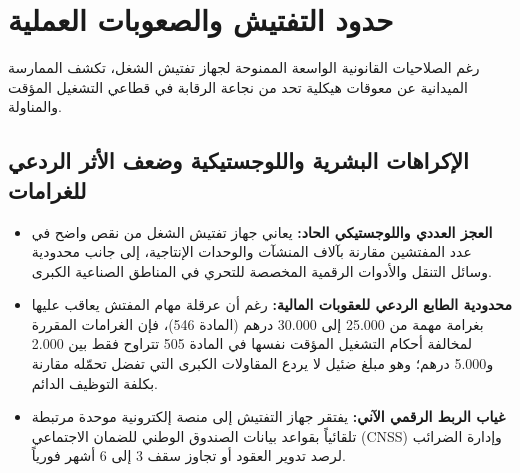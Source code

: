 \vspace{0.5em}

\section{حدود التفتيش والصعوبات العملية}

رغم الصلاحيات القانونية الواسعة الممنوحة لجهاز تفتيش الشغل، تكشف الممارسة الميدانية عن معوقات هيكلية تحد من نجاعة الرقابة في قطاعي التشغيل المؤقت والمناولة.

\subsection{الإكراهات البشرية واللوجستيكية وضعف الأثر الردعي للغرامات}
\begin{itemize}[leftmargin=*, itemsep=5pt]
    \item \textbf{العجز العددي واللوجستيكي الحاد:} يعاني جهاز تفتيش الشغل من نقص واضح في عدد المفتشين مقارنة بآلاف المنشآت والوحدات الإنتاجية، إلى جانب محدودية وسائل التنقل والأدوات الرقمية المخصصة للتحري في المناطق الصناعية الكبرى.
    \item \textbf{محدودية الطابع الردعي للعقوبات المالية:} رغم أن عرقلة مهام المفتش يعاقب عليها بغرامة مهمة من \textenglish{25.000} إلى \textenglish{30.000} درهم (المادة \textenglish{546})، فإن الغرامات المقررة لمخالفة أحكام التشغيل المؤقت نفسها في المادة \textenglish{505} تتراوح فقط بين \textenglish{2.000} و\textenglish{5.000} درهم؛ وهو مبلغ ضئيل لا يردع المقاولات الكبرى التي تفضل تحمّله مقارنة بكلفة التوظيف الدائم.
    \item \textbf{غياب الربط الرقمي الآني:} يفتقر جهاز التفتيش إلى منصة إلكترونية موحدة مرتبطة تلقائياً بقواعد بيانات الصندوق الوطني للضمان الاجتماعي (\textenglish{CNSS}) وإدارة الضرائب لرصد تدوير العقود أو تجاوز سقف \textenglish{3} إلى \textenglish{6} أشهر فورياً.
\end{itemize}

